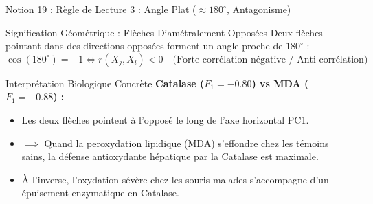\documentclass[aspectratio=169,10pt]{beamer}
\begin{document}
\begin{frame}{Notion 19 : Règle de Lecture 3 : Angle Plat ($\approx 180^\circ$, Antagonisme)}
  \begin{conceptbox}{Signification Géométrique : Flèches Diamétralement Opposées}
    \footnotesize
    Deux flèches pointant dans des directions opposées forment un angle proche de $180^\circ$ :
    \begin{equation*}
      \cos(180^\circ) = -1 \iff r(X_j, X_l) < 0 \quad \text{(Forte corrélation négative / Anti-corrélation)}
    \end{equation*}
  \end{conceptbox}
  \vspace{1mm}
  \begin{biobox}{Interprétation Biologique Concrète}
    \footnotesize
    \textbf{Catalase ($F_1 = -0.80$) vs MDA ($F_1 = +0.88$) :}
    \begin{itemize}
      \item Les deux flèches pointent à l'opposé le long de l'axe horizontal PC1.
      \item $\implies$ Quand la peroxydation lipidique (MDA) s'effondre chez les témoins sains, la défense antioxydante hépatique par la Catalase est maximale.
      \item À l'inverse, l'oxydation sévère chez les souris malades s'accompagne d'un épuisement enzymatique en Catalase.
    \end{itemize}
  \end{biobox}
\end{frame}
\end{document}
